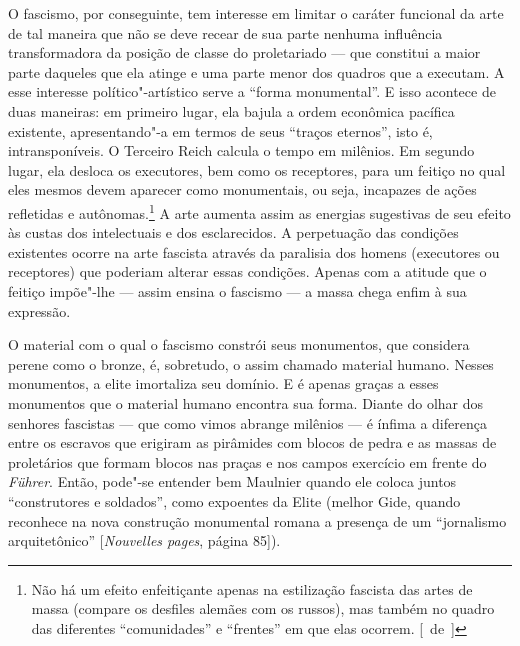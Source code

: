 O fascismo, por conseguinte, tem interesse ​​em limitar o caráter
funcional da arte de tal maneira que não se deve recear de sua parte
nenhuma influência transformadora da posição de classe do proletariado
--- que constitui a maior parte daqueles que ela atinge e uma parte menor
dos quadros que a executam. A esse interesse político"-artístico serve a
``forma monumental''. E isso acontece de duas maneiras: em primeiro
lugar, ela bajula a ordem econômica pacífica existente, apresentando"-a
em termos de seus ``traços eternos'', isto é, intransponíveis. O
Terceiro Reich calcula o tempo em milênios. Em segundo lugar, ela
desloca os executores, bem como os receptores, para um feitiço
no qual eles mesmos devem aparecer como monumentais, ou
seja, incapazes de ações refletidas e autônomas.\footnote{Não há
  um efeito enfeitiçante apenas na estilização fascista das artes de
  massa (compare os desfiles alemães com os russos), mas também no
  quadro das diferentes ``comunidades'' e ``frentes'' em que elas
  ocorrem. [~de~]} A arte aumenta assim as energias sugestivas de seu efeito às
custas dos intelectuais e dos esclarecidos. A perpetuação das condições
existentes ocorre na arte fascista através da paralisia dos homens
(executores ou receptores) que poderiam alterar essas condições. Apenas
com a atitude que o feitiço impõe"-lhe --- assim ensina o fascismo --- a
massa chega enfim à sua expressão.

O material com o qual o fascismo constrói seus monumentos, que considera
perene como o bronze, é, sobretudo, o assim chamado material humano.
Nesses monumentos, a elite imortaliza seu domínio. E é apenas graças a
esses monumentos que o material humano encontra sua forma. Diante do
olhar dos senhores fascistas --- que como vimos abrange milênios --- é
ínfima a diferença entre os escravos que erigiram as pirâmides com
blocos de pedra e as massas de proletários que formam blocos nas praças
e nos campos exercício em frente do \emph{Führer}. Então, pode"-se %
entender bem Maulnier quando ele coloca juntos ``construtores e
soldados'', como expoentes da Elite (melhor Gide, quando reconhece na
nova construção monumental romana a presença de um ``jornalismo
arquitetônico'' {[}\emph{Nouvelles pages}, página 85{]}).

